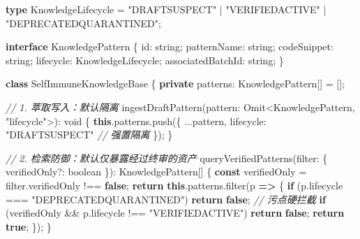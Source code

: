 \documentclass[
]{ctexart}
\newenvironment{Shaded}{}{}
\newcommand{\AttributeTok}[1]{\textcolor[rgb]{0.49,0.56,0.16}{#1}}
\newcommand{\BuiltInTok}[1]{\textcolor[rgb]{0.00,0.50,0.00}{#1}}
\newcommand{\CommentTok}[1]{\textcolor[rgb]{0.38,0.63,0.69}{\textit{#1}}}
\newcommand{\ControlFlowTok}[1]{\textcolor[rgb]{0.00,0.44,0.13}{\textbf{#1}}}
\newcommand{\DataTypeTok}[1]{\textcolor[rgb]{0.56,0.13,0.00}{#1}}
\newcommand{\FunctionTok}[1]{\textcolor[rgb]{0.02,0.16,0.49}{#1}}
\newcommand{\KeywordTok}[1]{\textcolor[rgb]{0.00,0.44,0.13}{\textbf{#1}}}
\newcommand{\NormalTok}[1]{#1}
\newcommand{\OperatorTok}[1]{\textcolor[rgb]{0.40,0.40,0.40}{#1}}
\newcommand{\StringTok}[1]{\textcolor[rgb]{0.25,0.44,0.63}{#1}}
\renewcommand{\_}{\discretionary{}{}{\textunderscore}}
\begin{document}
\begin{Shaded}
\begin{Highlighting}[]
\KeywordTok{type}\NormalTok{ KnowledgeLifecycle }\OperatorTok{=} \StringTok{"DRAFT\_SUSPECT"} \OperatorTok{|} \StringTok{"VERIFIED\_ACTIVE"} \OperatorTok{|} \StringTok{"DEPRECATED\_QUARANTINED"}\OperatorTok{;}

\KeywordTok{interface}\NormalTok{ KnowledgePattern \{}
\NormalTok{  id}\OperatorTok{:} \DataTypeTok{string}\OperatorTok{;}
\NormalTok{  patternName}\OperatorTok{:} \DataTypeTok{string}\OperatorTok{;}
\NormalTok{  codeSnippet}\OperatorTok{:} \DataTypeTok{string}\OperatorTok{;}
\NormalTok{  lifecycle}\OperatorTok{:}\NormalTok{ KnowledgeLifecycle}\OperatorTok{;}
\NormalTok{  associatedBatchId}\OperatorTok{:} \DataTypeTok{string}\OperatorTok{;}
\NormalTok{\}}

\KeywordTok{class}\NormalTok{ SelfImmuneKnowledgeBase \{}
  \KeywordTok{private}\NormalTok{ patterns}\OperatorTok{:}\NormalTok{ KnowledgePattern[] }\OperatorTok{=}\NormalTok{ []}\OperatorTok{;}

  \CommentTok{// 1. 萃取写入：默认隔离}
  \FunctionTok{ingestDraftPattern}\NormalTok{(pattern}\OperatorTok{:} \BuiltInTok{Omit}\OperatorTok{\textless{}}\NormalTok{KnowledgePattern}\OperatorTok{,} \StringTok{"lifecycle"}\OperatorTok{\textgreater{}}\NormalTok{)}\OperatorTok{:} \DataTypeTok{void}\NormalTok{ \{}
    \KeywordTok{this}\OperatorTok{.}\AttributeTok{patterns}\OperatorTok{.}\FunctionTok{push}\NormalTok{(\{}
      \OperatorTok{...}\NormalTok{pattern}\OperatorTok{,}
\NormalTok{      lifecycle}\OperatorTok{:} \StringTok{"DRAFT\_SUSPECT"} \CommentTok{// 强置隔离}
\NormalTok{    \})}\OperatorTok{;}
\NormalTok{  \}}

  \CommentTok{// 2. 检索防御：默认仅暴露经过终审的资产}
  \FunctionTok{queryVerifiedPatterns}\NormalTok{(filter}\OperatorTok{:}\NormalTok{ \{ verifiedOnly}\OperatorTok{?:} \DataTypeTok{boolean}\NormalTok{ \})}\OperatorTok{:}\NormalTok{ KnowledgePattern[] \{}
    \KeywordTok{const}\NormalTok{ verifiedOnly }\OperatorTok{=}\NormalTok{ filter}\OperatorTok{.}\AttributeTok{verifiedOnly} \OperatorTok{!==} \KeywordTok{false}\OperatorTok{;}
    \ControlFlowTok{return} \KeywordTok{this}\OperatorTok{.}\AttributeTok{patterns}\OperatorTok{.}\FunctionTok{filter}\NormalTok{(p }\KeywordTok{=\textgreater{}}\NormalTok{ \{}
      \ControlFlowTok{if}\NormalTok{ (p}\OperatorTok{.}\AttributeTok{lifecycle} \OperatorTok{===} \StringTok{"DEPRECATED\_QUARANTINED"}\NormalTok{) }\ControlFlowTok{return} \KeywordTok{false}\OperatorTok{;} \CommentTok{// 污点硬拦截}
      \ControlFlowTok{if}\NormalTok{ (verifiedOnly }\OperatorTok{\&\&}\NormalTok{ p}\OperatorTok{.}\AttributeTok{lifecycle} \OperatorTok{!==} \StringTok{"VERIFIED\_ACTIVE"}\NormalTok{) }\ControlFlowTok{return} \KeywordTok{false}\OperatorTok{;}
      \ControlFlowTok{return} \KeywordTok{true}\OperatorTok{;}
\NormalTok{    \})}\OperatorTok{;}
\NormalTok{  \}}


\end{Highlighting}
\end{Shaded}
\end{document}
